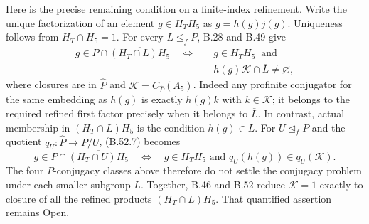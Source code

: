 Here is the precise remaining condition on a finite-index
refinement.  Write the unique factorization of an element
$g\in H_TH_5$ as $g=h(g)j(g)$.
Uniqueness follows from $H_T\cap H_5=1$.
For every $L\leq_f P$, B.28 and B.49 give
\[
 \begin{split}
 g\in P\cap\overline{(H_T\cap L)H_5}
 \quad\Longleftrightarrow\quad
 &g\in H_TH_5\ \text{ and }\\[-1mm]
 &h(g)\mathcal K\cap\overline L\ne\varnothing,
 \end{split}
 \tag{B.52.7}
\]
where closures are in $\widehat P$ and
$\mathcal K=C_{\widehat P}(A_5)$.
Indeed any profinite conjugator for the same embedding as
$h(g)$ is exactly $h(g)k$ with $k\in\mathcal K$;
it belongs to the required refined first factor precisely
when it belongs to $\overline L$.
In contrast, actual membership in $(H_T\cap L)H_5$ is
the condition $h(g)\in L$.
For $U\trianglelefteq_f P$ and the quotient
$q_U:\widehat P\to P/U$, (B.52.7) becomes
\[
 g\in P\cap\overline{(H_T\cap U)H_5}
 \quad\Longleftrightarrow\quad
 g\in H_TH_5\text{ and }q_U(h(g))\in q_U(\mathcal K).
 \tag{B.52.8}
\]
The four $P$-conjugacy classes above therefore do not settle
the conjugacy problem under each smaller subgroup $L$.
Together, B.46 and B.52 reduce $\mathcal K=1$ exactly to
closure of all the refined products $(H_T\cap L)H_5$.
That quantified assertion remains Open.
